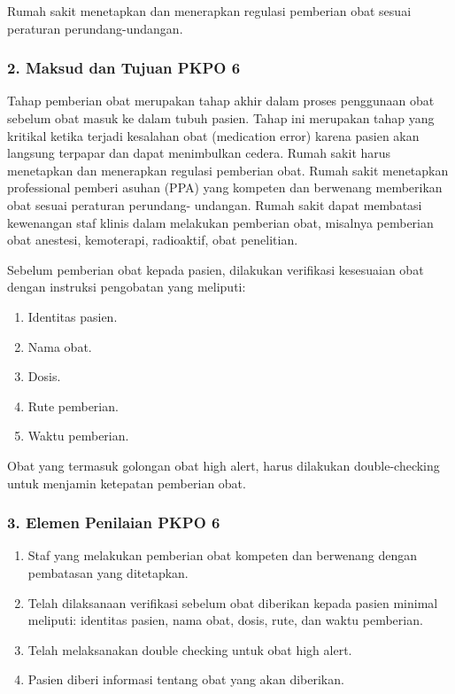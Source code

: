 \documentclass[
]{book}
\providecommand{\tightlist}{%
  \setlength{\itemsep}{0pt}\setlength{\parskip}{0pt}}
\begin{document}
Rumah sakit menetapkan dan menerapkan regulasi pemberian obat sesuai peraturan perundang-undangan.

\hypertarget{maksud-dan-tujuan-pkpo-6}{%
\subsubsection*{2. Maksud dan Tujuan PKPO 6}\label{maksud-dan-tujuan-pkpo-6}}

Tahap pemberian obat merupakan tahap akhir dalam proses penggunaan obat sebelum obat masuk ke dalam tubuh pasien. Tahap ini merupakan tahap yang kritikal ketika terjadi kesalahan obat (medication error) karena pasien akan langsung terpapar dan dapat menimbulkan cedera. Rumah sakit harus menetapkan dan menerapkan regulasi pemberian obat. Rumah sakit menetapkan professional pemberi asuhan (PPA) yang kompeten dan berwenang memberikan obat sesuai peraturan perundang- undangan. Rumah sakit dapat membatasi kewenangan staf klinis dalam melakukan pemberian obat, misalnya pemberian obat anestesi, kemoterapi, radioaktif, obat penelitian.

Sebelum pemberian obat kepada pasien, dilakukan verifikasi kesesuaian obat dengan instruksi pengobatan yang meliputi:

\begin{enumerate}
\def\labelenumi{\alph{enumi}.}
\tightlist
\item
  Identitas pasien.
\item
  Nama obat.
\item
  Dosis.
\item
  Rute pemberian.
\item
  Waktu pemberian.
\end{enumerate}

Obat yang termasuk golongan obat high alert, harus dilakukan double-checking untuk menjamin ketepatan pemberian obat.

\hypertarget{elemen-penilaian-pkpo-6}{%
\subsubsection*{3. Elemen Penilaian PKPO 6}\label{elemen-penilaian-pkpo-6}}

\begin{enumerate}
\def\labelenumi{\alph{enumi}.}
\tightlist
\item
  Staf yang melakukan pemberian obat kompeten dan berwenang dengan pembatasan yang ditetapkan.
\item
  Telah dilaksanaan verifikasi sebelum obat diberikan kepada pasien minimal meliputi: identitas pasien, nama obat, dosis, rute, dan waktu pemberian.
\item
  Telah melaksanakan double checking untuk obat high alert.
\item
  Pasien diberi informasi tentang obat yang akan diberikan.
\end{enumerate}
\end{document}
